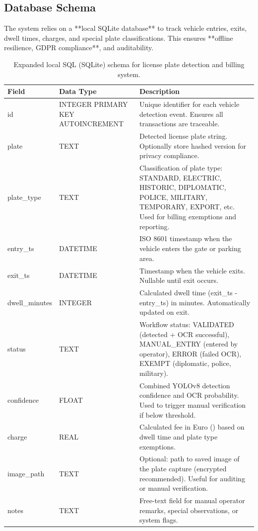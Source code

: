 	\subsection{Database Schema}
	The system relies on a **local SQLite database** to track vehicle entries, exits, dwell times, charges, and special plate classifications. This ensures **offline resilience, GDPR compliance**, and auditability.
	
	\begin{table}[h!]
		\centering
		\begin{threeparttable}
			\begin{tabular}{|l|l|p{8cm}|}
				\hline
				\textbf{Field} & \textbf{Data Type} & \textbf{Description} \\
				\hline
				id & INTEGER PRIMARY KEY AUTOINCREMENT & Unique identifier for each vehicle detection event. Ensures all transactions are traceable. \\
				\hline
				plate & TEXT & Detected license plate string. Optionally store hashed version for privacy compliance. \\
				\hline
				plate\_type & TEXT & Classification of plate type: STANDARD, ELECTRIC, HISTORIC, DIPLOMATIC, POLICE, MILITARY, TEMPORARY, EXPORT, etc. Used for billing exemptions and reporting. \\
				\hline
				entry\_ts & DATETIME & ISO 8601 timestamp when the vehicle enters the gate or parking area. \\
				\hline
				exit\_ts & DATETIME & Timestamp when the vehicle exits. Nullable until exit occurs. \\
				\hline
				dwell\_minutes & INTEGER & Calculated dwell time (exit\_ts - entry\_ts) in minutes. Automatically updated on exit. \\
				\hline
				status & TEXT & Workflow status: VALIDATED (detected + OCR successful), MANUAL\_ENTRY (entered by operator), ERROR (failed OCR), EXEMPT (diplomatic, police, military). \\
				\hline
				confidence & FLOAT & Combined YOLOv8 detection confidence and OCR probability. Used to trigger manual verification if below threshold. \\
				\hline
				charge & REAL & Calculated fee in Euro (\texteuro{}) based on dwell time and plate type exemptions. \\
				\hline
				image\_path & TEXT & Optional: path to saved image of the plate capture (encrypted recommended). Useful for auditing or manual verification. \\
				\hline
				notes & TEXT & Free-text field for manual operator remarks, special observations, or system flags. \\
				\hline
			\end{tabular}
			\caption{Expanded local SQL (SQLite) schema for license plate detection and billing system.}
			\label{tab:db_schema}
		\end{threeparttable}
	\end{table}
	
